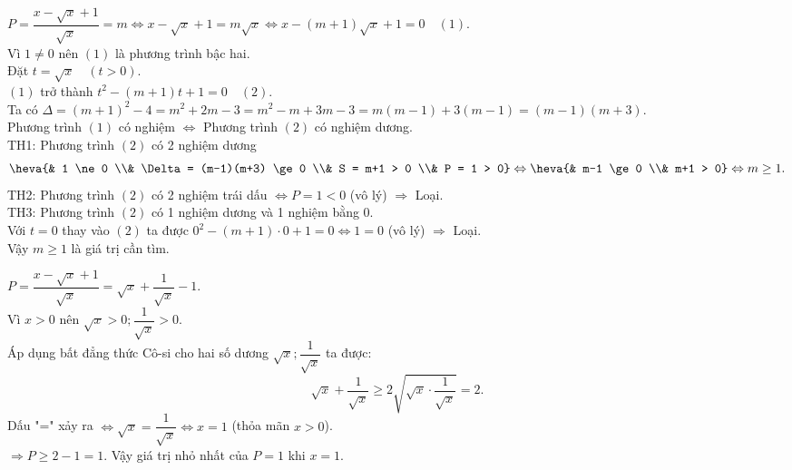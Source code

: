 \documentclass[12pt]{article}
\begin{document}
\begin{bt}
{\begin{cacy}
\item $P = \dfrac{x-\sqrt{x}+1}{\sqrt{x}} = m \Leftrightarrow x-\sqrt{x}+1 = m\sqrt{x} \Leftrightarrow x-(m+1)\sqrt{x}+1 = 0 \quad (1)$.\\
Vì $1 \ne 0$ nên $(1)$ là phương trình bậc hai.\\
Đặt $t = \sqrt{x} \quad (t > 0)$.\\
$(1)$ trở thành $t^2 - (m+1)t + 1 = 0 \quad (2)$.\\
Ta có $\Delta = (m+1)^2 - 4 = m^2+2m-3 = m^2-m+3m-3 = m(m-1)+3(m-1) = (m-1)(m+3)$.\\
Phương trình $(1)$ có nghiệm $\Leftrightarrow$ Phương trình $(2)$ có nghiệm dương.\\
TH1: Phương trình $(2)$ có 2 nghiệm dương
\[ \heva{& 1 \ne 0 \\& \Delta = (m-1)(m+3) \ge 0 \\& S = m+1 > 0 \\& P = 1 > 0} \Leftrightarrow \heva{& m-1 \ge 0 \\& m+1 > 0} \Leftrightarrow m \ge 1. \]
TH2: Phương trình $(2)$ có 2 nghiệm trái dấu $\Leftrightarrow P = 1 < 0$ (vô lý) $\Rightarrow$ Loại.\\
TH3: Phương trình $(2)$ có 1 nghiệm dương và 1 nghiệm bằng 0.\\
Với $t = 0$ thay vào $(2)$ ta được $0^2 - (m+1) \cdot 0 + 1 = 0 \Leftrightarrow 1 = 0$ (vô lý) $\Rightarrow$ Loại.\\
Vậy $m \ge 1$ là giá trị cần tìm.

\item $P = \dfrac{x-\sqrt{x}+1}{\sqrt{x}} = \sqrt{x} + \dfrac{1}{\sqrt{x}} - 1$.\\
Vì $x > 0$ nên $\sqrt{x} > 0; \dfrac{1}{\sqrt{x}} > 0$.\\
Áp dụng bất đẳng thức Cô-si cho hai số dương $\sqrt{x}; \dfrac{1}{\sqrt{x}}$ ta được:
\[ \sqrt{x} + \dfrac{1}{\sqrt{x}} \ge 2\sqrt{\sqrt{x} \cdot \dfrac{1}{\sqrt{x}}} = 2. \]
Dấu "=" xảy ra $\Leftrightarrow \sqrt{x} = \dfrac{1}{\sqrt{x}} \Leftrightarrow x = 1$ (thỏa mãn $x > 0$).\\
$\Rightarrow P \ge 2-1 = 1$. Vậy giá trị nhỏ nhất của $P = 1$ khi $x = 1$.
\end{cacy}
}
\end{bt}
\end{document}

